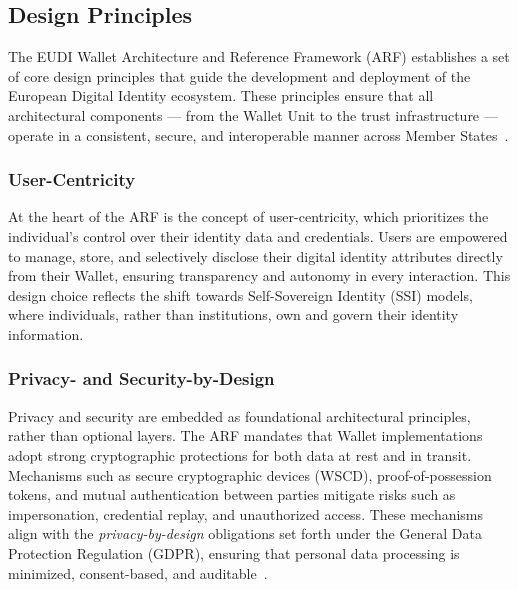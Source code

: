 \documentclass[sigconf,balance,nonacm,authordraft]{acmart}
\begin{document}
\subsection{Design Principles}

The EUDI Wallet Architecture and Reference Framework (ARF) establishes a set of core design principles that guide the development and deployment of the European Digital Identity ecosystem. These principles ensure that all architectural components — from the Wallet Unit to the trust infrastructure — operate in a consistent, secure, and interoperable manner across Member States~\cite{EU_ARF2024}.

\subsubsection*{User-Centricity}
At the heart of the ARF is the concept of user-centricity, which prioritizes the individual's control over their identity data and credentials. Users are empowered to manage, store, and selectively disclose their digital identity attributes directly from their Wallet, ensuring transparency and autonomy in every interaction. This design choice reflects the shift towards Self-Sovereign Identity (SSI) models, where individuals, rather than institutions, own and govern their identity information.

\subsubsection*{Privacy- and Security-by-Design}
Privacy and security are embedded as foundational architectural principles, rather than optional layers. The ARF mandates that Wallet implementations adopt strong cryptographic protections for both data at rest and in transit. Mechanisms such as secure cryptographic devices (WSCD), proof-of-possession tokens, and mutual authentication between parties mitigate risks such as impersonation, credential replay, and unauthorized access. These mechanisms align with the \textit{privacy-by-design} obligations set forth under the General Data Protection Regulation (GDPR), ensuring that personal data processing is minimized, consent-based, and auditable~\cite{EU_eIDAS2024}.
\end{document}
